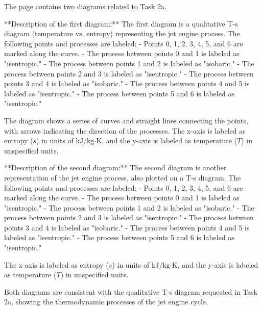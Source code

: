 The page contains two diagrams related to Task 2a.  

**Description of the first diagram:**  
The first diagram is a qualitative T-s diagram (temperature vs. entropy) representing the jet engine process. The following points and processes are labeled:  
- Points 0, 1, 2, 3, 4, 5, and 6 are marked along the curve.  
- The process between points 0 and 1 is labeled as "isentropic."  
- The process between points 1 and 2 is labeled as "isobaric."  
- The process between points 2 and 3 is labeled as "isentropic."  
- The process between points 3 and 4 is labeled as "isobaric."  
- The process between points 4 and 5 is labeled as "isentropic."  
- The process between points 5 and 6 is labeled as "isentropic."  

The diagram shows a series of curves and straight lines connecting the points, with arrows indicating the direction of the processes. The x-axis is labeled as entropy (\( s \)) in units of \( \text{kJ}/\text{kg·K} \), and the y-axis is labeled as temperature (\( T \)) in unspecified units.  

**Description of the second diagram:**  
The second diagram is another representation of the jet engine process, also plotted on a T-s diagram. The following points and processes are labeled:  
- Points 0, 1, 2, 3, 4, 5, and 6 are marked along the curve.  
- The process between points 0 and 1 is labeled as "isentropic."  
- The process between points 1 and 2 is labeled as "isobaric."  
- The process between points 2 and 3 is labeled as "isentropic."  
- The process between points 3 and 4 is labeled as "isobaric."  
- The process between points 4 and 5 is labeled as "isentropic."  
- The process between points 5 and 6 is labeled as "isentropic."  

The x-axis is labeled as entropy (\( s \)) in units of \( \text{kJ}/\text{kg·K} \), and the y-axis is labeled as temperature (\( T \)) in unspecified units.  

Both diagrams are consistent with the qualitative T-s diagram requested in Task 2a, showing the thermodynamic processes of the jet engine cycle.